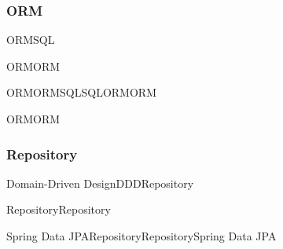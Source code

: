 \hypertarget{orm}{%
\subsubsection{ORM}\label{orm}}

ORMSQL\important{}

ORM\important{}\important{}\important{}ORM\important{}\important{}

ORM\important{}ORMSQLSQL\important{}ORM\important{}ORM

ORMORM

\hypertarget{repository}{%
\subsubsection{Repository}\label{repository}}

Domain-Driven DesignDDDRepository

Repository\important{}\important{}Repository\important{}\important{}

Spring Data JPARepository\important{}RepositorySpring Data JPA

